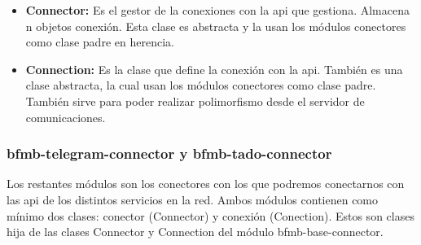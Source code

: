 \documentclass[spanish,12pt, a4paper, twoside]{paper}
\begin{document}
\begin{itemize}
\item\textbf{Connector:} Es el gestor de la conexiones con la api que gestiona. Almacena n objetos conexión. Esta clase es abstracta y la usan los módulos conectores como clase padre en herencia.
\item\textbf{Connection:} Es la clase que define la conexión con la api. También es una clase abstracta, la cual usan los módulos conectores como clase padre. También sirve para poder realizar polimorfismo desde el servidor de comunicaciones.
\end{itemize}

\subsubsection{bfmb-telegram-connector y bfmb-tado-connector}

Los restantes módulos son los conectores con los que podremos conectarnos con las api de los distintos servicios en la red. Ambos módulos contienen como mínimo dos clases: conector (Connector) y conexión (Conection). Estos son clases hija de las clases Connector y Connection del módulo bfmb-base-connector.
\end{document}
